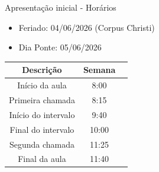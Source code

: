 
\begin{frame}{Apresentação inicial - Horários}
    \begin{itemize}
        \item Feriado: 04/06/2026 (Corpus Christi)
        \item Dia Ponte: 05/06/2026 
    \end{itemize}

    \vspace{1.0cm}
    \centering
    \begin{tabular}{|c|c|c|}
        \hline
        Descrição & Semana \\
        \hline
        Início da aula   & 8:00   \\
        Primeira chamada   & 8:15   \\
        Início do intervalo  & 9:40   \\
        Final do intervalo   & 10:00   \\
        Segunda chamada   & 11:25   \\
        Final da aula   & 11:40   \\
        \hline
    \end{tabular}
\end{frame}